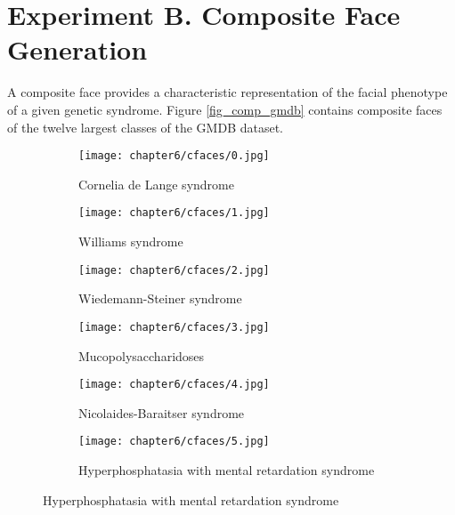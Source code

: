 \documentclass[../report.tex]{subfiles}
\begin{document}
    \section{Experiment B. Composite Face Generation}
    A composite face provides a characteristic representation of the facial phenotype of a given genetic
    syndrome. Figure \ref{fig_comp_gmdb} contains composite faces of the twelve largest classes of the GMDB dataset. 
       \begin{figure}[H]
    	\begin{subfigure}[t]{0.45\textwidth}
    		\centering
    		\texttt{[image: chapter6/cfaces/0.jpg]}
    		\caption{Cornelia de Lange syndrome}    		
    	\end{subfigure}
    	\begin{subfigure}[t]{0.45\textwidth}
    		\centering
    		\texttt{[image: chapter6/cfaces/1.jpg]}
    		\caption{Williams syndrome}   		
    	\end{subfigure}
    	\begin{subfigure}[t]{0.45\textwidth}
    		\centering
    		\texttt{[image: chapter6/cfaces/2.jpg]}
    		\caption{Wiedemann-Steiner syndrome}    	
    	\end{subfigure}
    \begin{subfigure}[t]{0.45\textwidth}
    	\centering
    	\texttt{[image: chapter6/cfaces/3.jpg]}
    	\caption{Mucopolysaccharidoses}
    \end{subfigure}
	\begin{subfigure}[t]{0.45\textwidth}
		\centering
		\texttt{[image: chapter6/cfaces/4.jpg]}
		\caption{Nicolaides-Baraitser syndrome}
	\end{subfigure}
	\hspace{1.5cm}
	\begin{subfigure}[t]{0.45\textwidth}
		\centering
		\texttt{[image: chapter6/cfaces/5.jpg]}
		\caption{Hyperphosphatasia with mental retardation syndrome}
	\end{subfigure}
	\end{figure}
\end{document}
